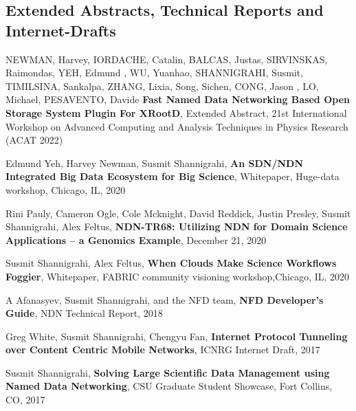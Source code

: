 \subsection{Extended Abstracts, Technical Reports and Internet-Drafts}
\begin{etaremune}

\item {}

\item {}

\item NEWMAN, Harvey, IORDACHE, Catalin, BALCAS, Justas, SIRVINSKAS, Raimondas, YEH, Edmund , WU, Yuanhao, SHANNIGRAHI, Susmit, TIMILSINA, Sankalpa, ZHANG, Lixia, Song, Sichen, CONG, Jason , LO, Michael, PESAVENTO, Davide \textbf{Fast Named Data Networking Based Open Storage System Plugin For XRootD}, Extended Abstract, 21st International Workshop on Advanced Computing and Analysis Techniques in Physics Research (ACAT 2022)

\item {}

\item Edmund Yeh, Harvey Newman, Susmit Shannigrahi, \textbf{An SDN/NDN Integrated Big Data Ecosystem for Big Science},  Whitepaper, Huge-data workshop, Chicago, IL, 2020

\item Rini Pauly, Cameron Ogle, Cole Mcknight, David Reddick, Justin Presley, Susmit Shannigrahi, Alex Feltus, \textbf{NDN-TR68: Utilizing NDN for Domain Science Applications – a Genomics Example}, December 21, 2020

\item Susmit Shannigrahi, Alex Feltus, \textbf{When Clouds Make Science Workflows Foggier}, Whitepaper, FABRIC community visioning workshop,Chicago, IL, 2020

\item A Afanasyev, Susmit Shannigrahi, and the NFD team, \textbf{NFD Developer's Guide}, NDN Technical Report, 2018

\item Greg White, Susmit Shannigrahi, Chengyu Fan, \textbf{Internet Protocol Tunneling over Content Centric Mobile Networks}, ICNRG Internet Draft, 2017

\item Susmit Shannigrahi, \textbf{Solving Large Scientific Data Management using Named Data Networking}, CSU Graduate Student Showcase, Fort Collins, CO, 2017


\end{etaremune}
